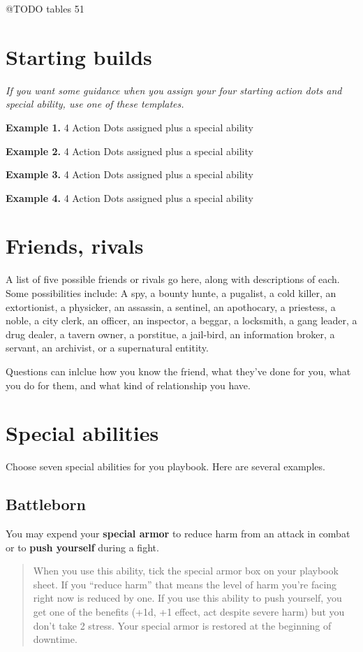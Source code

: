 \documentclass[11pt,fleqn,a5paper]{book}
\begin{document}
@TODO tables 51


\section{Starting builds}

\emph{If you want some guidance when you assign your four starting action dots and special ability, use one of these templates.}

\textbf{Example 1.} 4 Action Dots assigned plus a special ability

\textbf{Example 2.} 4 Action Dots assigned plus a special ability

\textbf{Example 3.} 4 Action Dots assigned plus a special ability

\textbf{Example 4.} 4 Action Dots assigned plus a special ability

\section{Friends, rivals}

A list of five possible friends or rivals go here, along with descriptions of each. Some possibilities include: A spy, a bounty hunte, a pugalist, a cold killer, an extortionist, a physicker, an assassin, a sentinel, an apothocary, a priestess, a noble, a city clerk, an officer, an inspector, a beggar, a locksmith, a gang leader, a drug dealer, a tavern owner, a porstitue, a jail-bird, an information broker, a servant, an archivist, or a supernatural entitity.

Questions can inlclue how you know the friend, what they’ve done for you,  what you do for them, and what kind of relationship you have.

\section{Special abilities}

Choose seven special abilities for you playbook. Here are several examples.

\subsection{Battleborn}

You may expend your \textbf{special armor} to reduce harm from an attack in combat or to \textbf{push yourself} during a fight.

\begin{quote}
	When you use this ability, tick the special armor box on your playbook sheet. If you “reduce harm” that means the level of harm you’re facing right now is reduced by one. If you use this ability to push yourself, you get one of the benefits (+1d, +1 effect, act despite severe harm) but you don’t take 2 stress. Your special armor is restored at the beginning of downtime.
\end{quote}
\end{document}

